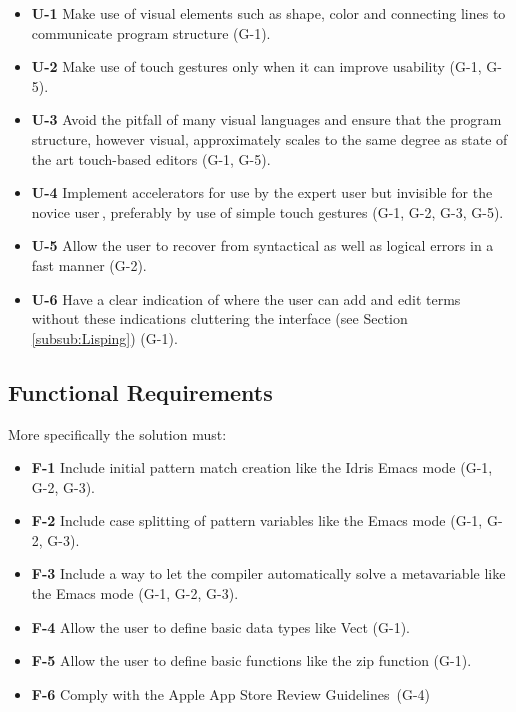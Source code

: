 \begin{itemize}     
	\item \textbf{U-1} Make use of visual elements such as shape, color and connecting lines to communicate program structure
	(G-1).
	\item \textbf{U-2} Make use of touch gestures only when it can improve usability
	(G-1, G-5).
	\item \textbf{U-3} Avoid the pitfall of many visual languages\cite{green1992visual} and ensure 
	that the program structure, however visual, approximately scales to the same degree as state of 
	the art touch-based editors 
	(G-1, G-5).
	\item \textbf{U-4} Implement accelerators for use by the expert user but invisible for the novice
	user\,\cite{nielsen1990heuristic}, preferably by use of simple touch gestures
	(G-1, G-2, G-3, G-5).
	\item \textbf{U-5} Allow the user to recover from syntactical as well as logical errors in a fast
	manner (G-2).
	\item \textbf{U-6} Have a clear indication of where the user can add and edit terms without these
	indications cluttering the interface (see Section \ref{subsub:Lisping}) (G-1).
\end{itemize}


\subsection{Functional Requirements} 
\label{subsec:FunctionalRequirements} 
More specifically the solution must:

\begin{itemize}
	\item \textbf{F-1} Include initial pattern match creation like the Idris 
	Emacs mode \cite{Idris:EmacsMode} (G-1, G-2, G-3).
	\item \textbf{F-2} Include case splitting of pattern variables like the Emacs mode \cite{Idris:EmacsMode} (G-1, G-2, G-3).
	\item \textbf{F-3} Include a way to let the compiler automatically solve a metavariable like the
	Emacs mode \cite{Idris:EmacsMode} (G-1, G-2, G-3).
	\item \textbf{F-4} Allow the user to define basic data types like Vect (G-1).
	\item \textbf{F-5} Allow the user to define basic functions like the zip function
	(G-1).
	\item \textbf{F-6} Comply with the Apple App Store Review Guidelines\,\cite{AppStoreGuidelines}
	(G-4)
\end{itemize}

